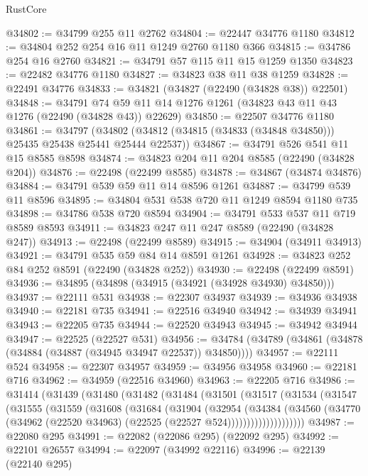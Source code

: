 \begin{lexlean}{RustCore}
\begin{coremodule}
@34802 := @34799 @255 @11 @2762
@34804 := @22447 @34776 @1180
@34812 := @34804 @252 @254 @16 @11 @1249 @2760 @1180 @366
@34815 := @34786 @254 @16 @2760
@34821 := @34791 @57 @115 @11 @15 @1259 @1350
@34823 := @22482 @34776 @1180
@34827 := @34823 @38 @11 @38 @1259
@34828 := @22491 @34776
@34833 := @34821 (@34827 (@22490 (@34828 @38)) @22501)
@34848 := @34791 @74 @59 @11 @14 @1276 @1261 (@34823 @43 @11 @43 @1276 (@22490 (@34828 @43)) @22629)
@34850 := @22507 @34776 @1180
@34861 := @34797
    (@34802 (@34812 (@34815 (@34833 (@34848 @34850))) @25435 @25438 @25441 @25444 @22537))
@34867 := @34791 @526 @541 @11 @15 @8585 @8598
@34874 := @34823 @204 @11 @204 @8585 (@22490 (@34828 @204))
@34876 := @22498 (@22499 @8585)
@34878 := @34867 (@34874 @34876)
@34884 := @34791 @539 @59 @11 @14 @8596 @1261
@34887 := @34799 @539 @11 @8596
@34895 := @34804 @531 @538 @720 @11 @1249 @8594 @1180 @735
@34898 := @34786 @538 @720 @8594
@34904 := @34791 @533 @537 @11 @719 @8589 @8593
@34911 := @34823 @247 @11 @247 @8589 (@22490 (@34828 @247))
@34913 := @22498 (@22499 @8589)
@34915 := @34904 (@34911 @34913)
@34921 := @34791 @535 @59 @84 @14 @8591 @1261
@34928 := @34823 @252 @84 @252 @8591 (@22490 (@34828 @252))
@34930 := @22498 (@22499 @8591)
@34936 := @34895 (@34898 (@34915 (@34921 (@34928 @34930) @34850)))
@34937 := @22111 @531
@34938 := @22307 @34937
@34939 := @34936 @34938
@34940 := @22181 @735
@34941 := @22516 @34940
@34942 := @34939 @34941
@34943 := @22205 @735
@34944 := @22520 @34943
@34945 := @34942 @34944
@34947 := @22525 (@22527 @531)
@34956 := @34784 (@34789 (@34861 (@34878 (@34884 (@34887 (@34945 @34947 @22537)) @34850))))
@34957 := @22111 @524
@34958 := @22307 @34957
@34959 := @34956 @34958
@34960 := @22181 @716
@34962 := @34959 (@22516 @34960)
@34963 := @22205 @716
@34986 := @31414
    (@31439
      (@31480
        (@31482
          (@31484
            (@31501
              (@31517
                (@31534
                  (@31547
                    (@31555
                      (@31559
                        (@31608
                          (@31684
                            (@31904
                              (@32954
                                (@34384
                                  (@34560
                                    (@34770
                                      (@34962
                                        (@22520 @34963)
                                        (@22525 (@22527 @524))))))))))))))))))))
@34987 := @22080 @295
@34991 := @22082 (@22086 @295) (@22092 @295)
@34992 := @22101 @26557
@34994 := @22097 (@34992 @22116)
@34996 := @22139 (@22140 @295)

\end{coremodule}
\end{lexlean}
